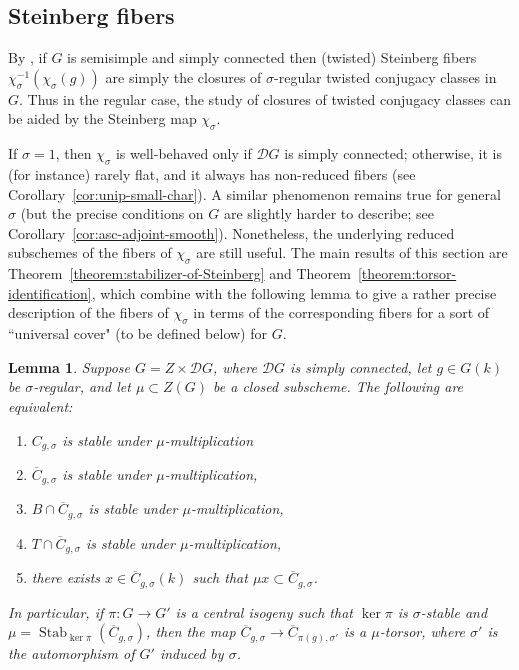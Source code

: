 \documentclass[11pt,reqno]{amsart}
\newtheorem{lemma}[theorem]{Lemma}
\theoremstyle{definition}
\newcommand{\sD}{{\mathscr D}}
\DeclareMathOperator{\Stab}{Stab}
\newcommand{\ov}[1]{\overline{#1}}
\begin{document}
\subsection{Steinberg fibers}\label{section:Steinberg}

By \cite[Corollary 5.3.5]{Xiao-Zhu}, if $G$ is semisimple and simply connected then (twisted) Steinberg fibers $\chi_\sigma^{-1}(\chi_\sigma(g))$ are simply the closures of $\sigma$-regular twisted conjugacy classes in $G$. Thus in the regular case, the study of closures of twisted conjugacy classes can be aided by the Steinberg map $\chi_\sigma$.

If $\sigma = 1$, then $\chi_\sigma$ is well-behaved only if $\sD G$ is simply connected; otherwise, it is (for instance) rarely flat, and it always has non-reduced fibers (see Corollary~\ref{cor:unip-small-char}). A similar phenomenon remains true for general $\sigma$ (but the precise conditions on $G$ are slightly harder to describe; see Corollary~\ref{cor:asc-adjoint-smooth}). Nonetheless, the underlying reduced subschemes of the fibers of $\chi_\sigma$ are still useful. The main results of this section are Theorem~\ref{theorem:stabilizer-of-Steinberg} and Theorem~\ref{theorem:torsor-identification}, which combine with the following lemma to give a rather precise description of the fibers of $\chi_\sigma$ in terms of the corresponding fibers for a sort of ``universal cover" (to be defined below) for $G$.

\begin{lemma}\label{lemma:stability-equivalences}
    Suppose $G = Z \times \sD G$, where $\sD G$ is simply connected, let $g \in G(k)$ be $\sigma$-regular, and let $\mu \subset Z(G)$ be a closed subscheme. The following are equivalent:
    \begin{enumerate}
        \item $C_{g,\sigma}$ is stable under $\mu$-multiplication
        \item $\ov{C}_{g,\sigma}$ is stable under $\mu$-multiplication,
        \item $B \cap \ov{C}_{g,\sigma}$ is stable under $\mu$-multiplication,
        \item $T \cap \ov{C}_{g,\sigma}$ is stable under $\mu$-multiplication,
        \item there exists $x \in \ov{C}_{g,\sigma}(k)$ such that $\mu x \subset \ov{C}_{g,\sigma}$.
    \end{enumerate}
    In particular, if $\pi\colon G \to G'$ is a central isogeny such that $\ker \pi$ is $\sigma$-stable and $\mu = \Stab_{\ker \pi}(\ov{C}_{g,\sigma})$, then the map $\ov{C}_{g,\sigma} \to \ov{C}_{\pi(g),\sigma'}$ is a $\mu$-torsor, where $\sigma'$ is the automorphism of $G'$ induced by $\sigma$.
\end{lemma}
\end{document}
